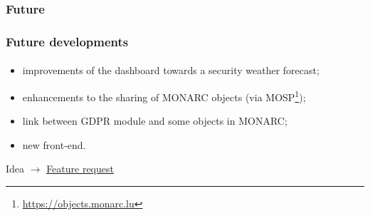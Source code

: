 \subsubsection{Future}
\begin{frame}
    \frametitle{Future developments}
    \framesubtitle{}
    \begin{itemize}
        \item improvements of the dashboard towards a security weather forecast;
        \item enhancements to the sharing of MONARC objects (via MOSP\footnote{\url{https://objects.monarc.lu}});
        \item link between GDPR module and some objects in MONARC;
        \item new front-end.
    \end{itemize}
    \bigskip
    Idea
    $\rightarrow$
    \href{https://github.com/monarc-project/MonarcAppFO/issues/new?labels=feature+request}{Feature request}
\end{frame}
